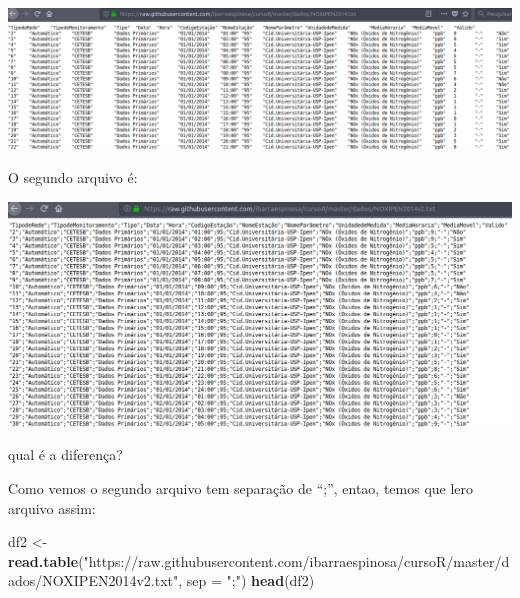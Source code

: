 \documentclass[]{book}
\newenvironment{Shaded}{\begin{snugshade}}{\end{snugshade}}
\newcommand{\KeywordTok}[1]{\textcolor[rgb]{0.13,0.29,0.53}{\textbf{#1}}}
\newcommand{\DataTypeTok}[1]{\textcolor[rgb]{0.13,0.29,0.53}{#1}}
\newcommand{\StringTok}[1]{\textcolor[rgb]{0.31,0.60,0.02}{#1}}
\newcommand{\NormalTok}[1]{#1}
\begin{document}
\includegraphics[width=18.47in]{figuras/f1}

O segundo arquivo é:

\includegraphics[width=15.33in]{figuras/f2}

qual é a diferença?

Como vemos o segundo arquivo tem separação de ``;'', entao, temos que
lero arquivo assim:

\begin{Shaded}
\begin{Highlighting}[]
\NormalTok{df2 <-}\StringTok{ }\KeywordTok{read.table}\NormalTok{(}\StringTok{"https://raw.githubusercontent.com/ibarraespinosa/cursoR/master/dados/NOXIPEN2014v2.txt"}\NormalTok{, }\DataTypeTok{sep =} \StringTok{";"}\NormalTok{)}
\KeywordTok{head}\NormalTok{(df2)}
\end{Highlighting}
\end{Shaded}
\end{document}
